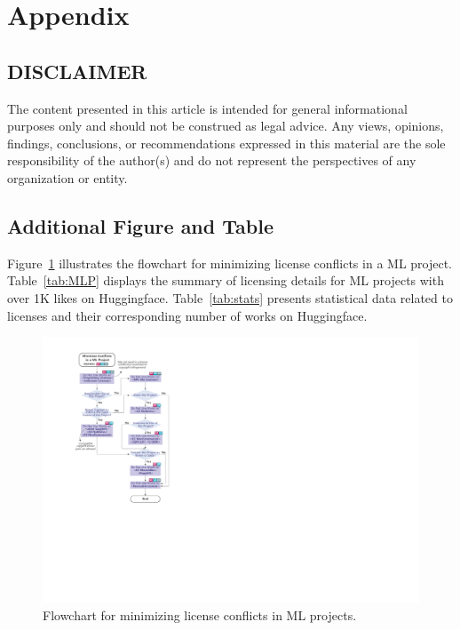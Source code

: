 \section{Appendix}

\subsection{DISCLAIMER}
\label{apdx:disclaimer}
The content presented in this article is intended for general informational purposes only and should not be construed as legal advice. Any views, opinions, findings, conclusions, or recommendations expressed in this material are the sole responsibility of the author(s) and do not represent the perspectives of any organization or entity.

\subsection{Additional Figure and Table}
\label{apdx:A}


Figure~\ref{fig:flowchart} illustrates the flowchart for minimizing license conflicts in a ML project.
Table~\ref{tab:MLP} displays the summary of licensing details for ML projects with over 1K likes on Huggingface.
Table~\ref{tab:stats} presents statistical data related to licenses and their corresponding number of works on Huggingface.

\begin{figure}[b]
  \centering
  \includegraphics[width=\linewidth]{fig/flowchart.pdf}
  \caption{Flowchart for minimizing license conflicts in ML projects.}
  \Description{}
  \label{fig:flowchart}
\end{figure}

